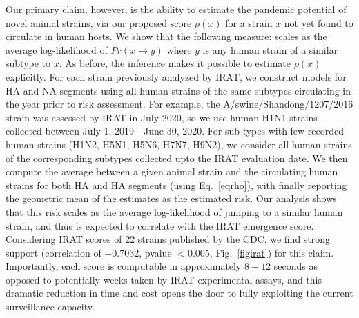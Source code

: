 \documentclass[onecolumn, compsoc,10pt]{IEEEtran}
\begin{document}
Our primary claim, however,  is the ability to estimate the pandemic potential of novel animal strains, via our proposed  \erisk score $\rho(x)$ for a strain $x$ not yet found to circulate in human hosts. We show that the following measure:%
%
scales as the average log-likelihood of $Pr(x \rightarrow y)$ where $y$ is any human strain of a similar subtype to $x$. As before, the \enet inference makes it possible to estimate $\rho(x)$ explicitly. 
%
For each strain previously analyzed by IRAT, we construct \enet models for HA and NA segments using all human strains of the same  subtypes circulating in the year prior to risk assessment. For example, the A/swine/Shandong/1207/2016 strain was assessed by IRAT in July 2020, so we  use human H1N1 strains collected  between July 1, 2019 - June 30, 2020. For sub-types with few recorded human strains (H1N2, H5N1, H5N6, H7N7, H9N2), we consider all human strains of the corresponding subtypes collected upto the IRAT evaluation date. We then compute the average \qdist between a given animal  strain  and the circulating human strains for both HA and HA segments (using Eq.~\eqref{eqrho}), with finally reporting the geometric mean of the estimates as the estimated risk. %
Our analysis shows that this risk scales as the average log-likelihood of jumping to a similar human strain, and thus is expected to correlate with the IRAT emergence score. Considering IRAT scores of 22 strains published by the CDC, we find strong support  (correlation of $-0.7032$, pvalue $< 0.005$, Fig.~\ref{figirat}) for this claim.
Importantly, each \erisk score  is  computable in approximately $8-12$ seconds as opposed to potentially weeks taken by IRAT experimental assays, and this dramatic reduction in time and cost  opens the door to fully exploiting the  current surveillance capacity.
\end{document}
